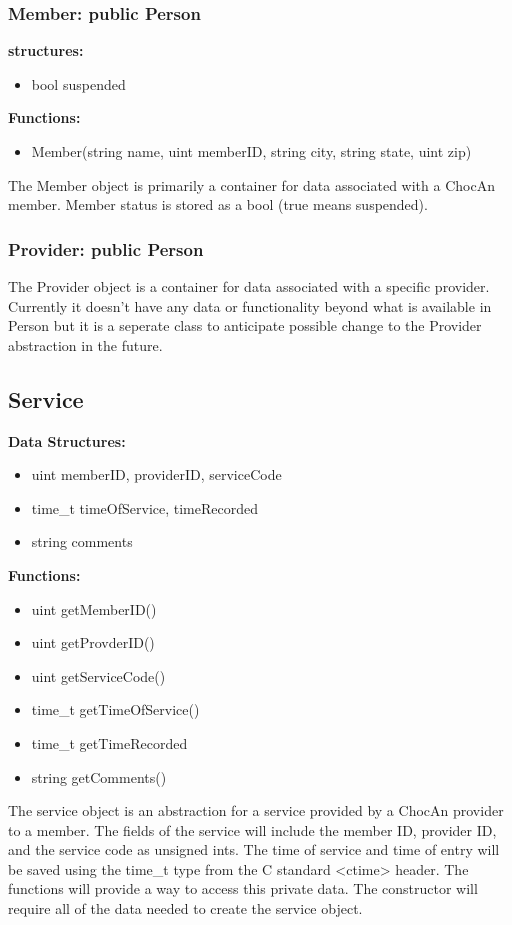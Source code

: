 \documentclass{article}
\begin{document}
\subsubsection{Member: public Person}
\textbf{structures:}
\begin{itemize}
   \item bool suspended
\end{itemize}
\textbf{Functions:}
\begin{itemize}
   \item Member(string name, uint memberID, string city, string state, uint zip)
\end{itemize}
The Member object is primarily a container for data associated with a ChocAn member. Member status is stored as a bool (true means suspended). 

\subsubsection{Provider: public Person}
The Provider object is a container for data associated with a specific provider. Currently it doesn’t have any data or functionality beyond what is available in Person but it is a seperate class to anticipate possible change to the Provider abstraction in the future.

\subsection{Service}
\textbf{Data Structures:}
\begin{itemize}
   \item uint memberID, providerID, serviceCode
   \item time_t timeOfService, timeRecorded
   \item string comments
\end{itemize}
\textbf{Functions:}
\begin{itemize}
   \item uint getMemberID()
   \item uint getProvderID()
   \item uint getServiceCode()
   \item time_t getTimeOfService()
   \item time_t getTimeRecorded
   \item string getComments()
\end{itemize}
The service object is an abstraction for a service provided by a ChocAn provider to a member. The fields of the service will include the member ID, provider ID, and the service code as unsigned ints. The time of service and time of entry will be saved using the time_t type from the C standard <ctime> header. The functions will provide a way to access this private data. The constructor will require all of the data needed to create the service object.
\end{document}
